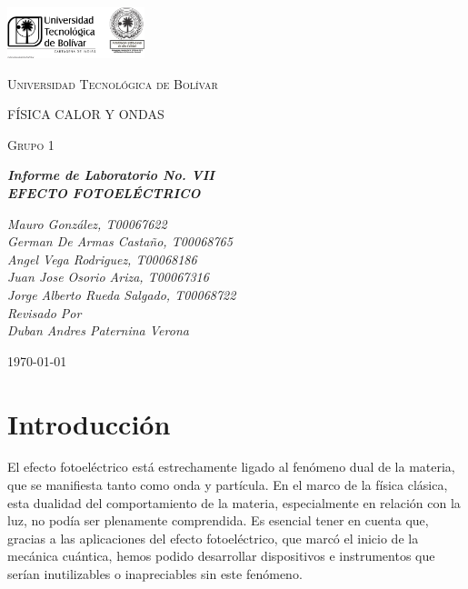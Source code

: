 \documentclass[letterpaper, 12pt]{article}
\begin{document}
\begin{titlepage}
      \centering
      \includegraphics[width=0.3\textwidth]{Images/logo_utb.png}\par\vspace{1cm}
      {\scshape\LARGE Universidad Tecnológica de Bolívar \par}
      \vspace{1cm}

      {\scshape\Large FÍSICA CALOR Y ONDAS \par}
      \vspace{.2cm}

      {\scshape\Large Grupo 1 \par}
      \vspace{1cm}
      \slshape {\Large \bfseries{}Informe de Laboratorio No. VII\\}
      \slshape {\small \bfseries{}EFECTO FOTOELÉCTRICO}
      \vspace{2cm}

      \slshape {\itshape{} Mauro González, T00067622 \\}
      \slshape {\itshape{} German De Armas Castaño, T00068765 \\}
      \slshape {\itshape{} Angel Vega Rodriguez, T00068186 \\}
      \slshape {\itshape{} Juan Jose Osorio Ariza, T00067316 \\}
      \slshape {\itshape{} Jorge Alberto Rueda Salgado, T00068722 \\}
      \vfill
      Revisado Por \\
      Duban Andres Paternina Verona\\
      {\large \today\par}
\end{titlepage}


\section{Introducción}

El efecto fotoeléctrico está estrechamente ligado al
fenómeno dual de la materia, que se manifiesta tanto como
onda y partícula. En el marco de la física clásica, esta
dualidad del comportamiento de la materia, especialmente en
relación con la luz, no podía ser plenamente comprendida.
Es esencial tener en cuenta que, gracias a las aplicaciones
del efecto fotoeléctrico, que marcó el inicio de la
mecánica cuántica, hemos podido desarrollar dispositivos e
instrumentos que serían inutilizables o inapreciables sin
este fenómeno.
\end{document}
